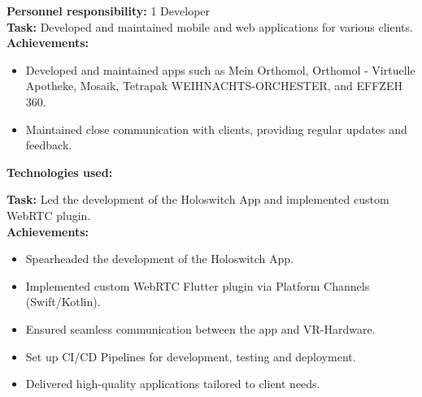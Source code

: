 \documentclass[10pt,a4paper,normalphoto]{altacv}
\begin{document}
\begin{fullwidth}
\newpage
\textbf{Personnel responsibility:} 1 Developer\\
\textbf{Task:} Developed and maintained mobile and web applications for various clients.\\
\textbf{Achievements:}
\begin{itemize}
    \item Developed and maintained apps such as Mein Orthomol, Orthomol - Virtuelle Apotheke, Mosaik, Tetrapak WEIHNACHTS-ORCHESTER, and EFFZEH 360.
    \item Maintained close communication with clients, providing regular updates and feedback.
\end{itemize}

\textbf{Technologies used:}\\[0.4em]


\vspace{2em}

\textbf{Task:} Led the development of the Holoswitch App and implemented custom WebRTC plugin.\\
\textbf{Achievements:}
\begin{itemize}
    \item Spearheaded the development of the Holoswitch App.
    \item Implemented custom WebRTC Flutter plugin via Platform Channels (Swift/Kotlin).
    \item Ensured seamless communication between the app and VR-Hardware.
    \item Set up CI/CD Pipelines for development, testing and deployment.
    \item Delivered high-quality applications tailored to client needs.
\end{itemize}


\end{fullwidth}
\end{document}
